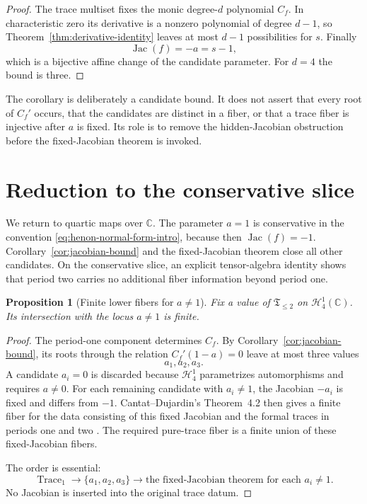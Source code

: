 \documentclass[11pt]{article}
\newtheorem{proposition}[theorem]{Proposition}
\theoremstyle{definition}
\newcommand{\C}{\mathbb C}
\newcommand{\Hn}{\mathcal H}
\newcommand{\Trace}{\operatorname{Trace}}
\newcommand{\Jac}{\operatorname{Jac}}
\begin{document}
\begin{proof}
The trace multiset fixes the monic degree-$d$ polynomial $C_f$. In characteristic zero its derivative is a nonzero polynomial of degree $d-1$, so Theorem~\ref{thm:derivative-identity} leaves at most $d-1$ possibilities for $s$. Finally
\[
\Jac(f)=-a=s-1,
\]
which is a bijective affine change of the candidate parameter. For $d=4$ the bound is three.
\end{proof}

The corollary is deliberately a candidate bound. It does not assert that every root of $C_f'$ occurs, that the candidates are distinct in a fiber, or that a trace fiber is injective after $a$ is fixed. Its role is to remove the hidden-Jacobian obstruction before the fixed-Jacobian theorem is invoked.

\section{Reduction to the conservative slice}
\label{sec:conservative}

We return to quartic maps over $\C$. The parameter $a=1$ is conservative in the convention \eqref{eq:henon-normal-form-intro}, because then $\Jac(f)=-1$. Corollary~\ref{cor:jacobian-bound} and the fixed-Jacobian theorem close all other candidates. On the conservative slice, an explicit tensor-algebra identity shows that period two carries no additional fiber information beyond period one.

\begin{proposition}[Finite lower fibers for $a\ne1$]
\label{prop:nonconservative-finite}
Fix a value of $\mathfrak T_{\le2}$ on $\Hn^1_4(\C)$. Its intersection with the locus $a\ne1$ is finite.
\end{proposition}

\begin{proof}
The period-one component determines $C_f$. By Corollary~\ref{cor:jacobian-bound}, its roots through the relation $C_f'(1-a)=0$ leave at most three values
\[
a_1,a_2,a_3.
\]
A candidate $a_i=0$ is discarded because $\Hn^1_4$ parametrizes automorphisms and requires $a\ne0$. For each remaining candidate with $a_i\ne1$, the Jacobian $-a_i$ is fixed and differs from $-1$. Cantat--Dujardin's Theorem~4.2 then gives a finite fiber for the data consisting of this fixed Jacobian and the formal traces in periods one and two \cite{CantatDujardin2026}. The required pure-trace fiber is a finite union of these fixed-Jacobian fibers.

The order is essential:
\[
\Trace_1
\longrightarrow
\{a_1,a_2,a_3\}
\longrightarrow
\text{the fixed-Jacobian theorem for each }a_i\ne1.
\]
No Jacobian is inserted into the original trace datum.
\end{proof}
\end{document}
